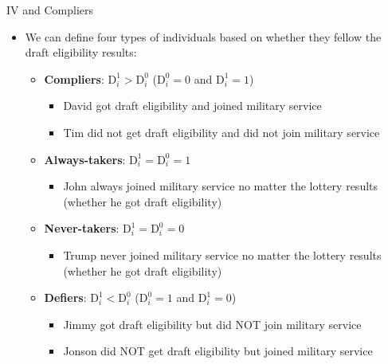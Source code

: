 \documentclass[dvipsnames,hyperref={pdfpagelabels=false}]{beamer}
\begin{document}
\begin{frame}{IV and Compliers}
	\begin{itemize}
		
		\item We can define four types of individuals based on whether they fellow the draft eligibility results:
		\vspace{0.2cm}
		\begin{itemize}
			\vspace{0.3cm}
			\item \textbf{Compliers}: $\mathrm{D}^{1}_{i}>\mathrm{D}^{0}_{i}$ ($\mathrm{D}^{0}_{i}=0$ and $\mathrm{D}^{1}_{i}=1$)
			\begin{itemize}
				\item David got draft eligibility and joined military service 
				\vspace{0.2cm}
				\item Tim did not get draft eligibility and did not join military service 
			\end{itemize}
			\item \textbf{Always-takers}: $\mathrm{D}^{1}_{i}=\mathrm{D}^{0}_{i}=1$
			\begin{itemize}
				\item John always joined military service no matter the lottery results (whether he got draft eligibility) 
				\vspace{0.2cm}
			\end{itemize}			
			\item \textbf{Never-takers}: $\mathrm{D}^{1}_{i}=\mathrm{D}^{0}_{i}=0$
			\begin{itemize}
				\item Trump never joined military service no matter the lottery results (whether he got draft eligibility) 
				\vspace{0.2cm}
			\end{itemize}			
			\item \textbf{Defiers}: $\mathrm{D}^{1}_{i}<\mathrm{D}^{0}_{i}$ ($\mathrm{D}^{0}_{i}=1$ and $\mathrm{D}^{1}_{i}=0$)
			\begin{itemize}
				\item Jimmy got draft eligibility but did NOT join military service 
				\vspace{0.2cm}
				\item Jonson did NOT get draft eligibility but joined military service 
			\end{itemize}
			
			
		\end{itemize}
		
	\end{itemize}
\end{frame}
\end{document}
